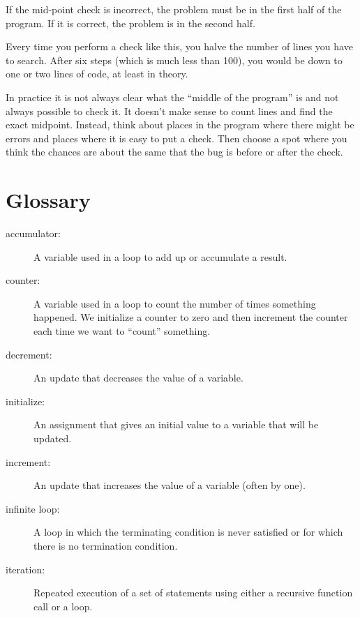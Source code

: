 \documentclass[10pt]{book}
\begin{document}
If the mid-point check is incorrect, the problem must be in the
first half of the program.  If it is correct, the problem is
in the second half.

Every time you perform a check like this, you halve the number
of lines you have to search.  After six steps (which is much
less than 100), you would be down to one or two lines of code,
at least in theory.

In practice it is not always clear what
the ``middle of the program'' is and not always possible to
check it.  It doesn't make sense to count lines and find the
exact midpoint.  Instead, think about places
in the program where there might be errors and places where it
is easy to put a check.  Then choose a spot where you
think the chances are about the same that the bug is before
or after the check.

\section{Glossary}

\begin{description}

\item[accumulator:] A variable used in a loop to add up or
accumulate a result.

\item[counter:] A variable used in a loop to count the number
of times something happened.  We initialize a counter to 
zero and then increment the counter each time we want to
``count'' something.

\item[decrement:] An update that decreases the value of a variable.

\item[initialize:] An assignment that gives an initial value to
a variable that will be updated.

\item[increment:] An update that increases the value of a variable
(often by one).

\item[infinite loop:] A loop in which the terminating condition is
never satisfied or for which there is no termination condition.

\item[iteration:] Repeated execution of a set of statements using
either a recursive function call or a loop.

\end{description}
\end{document}

